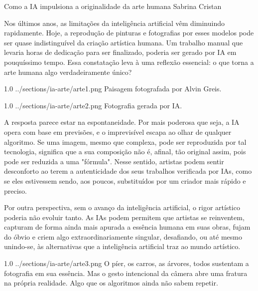 \hypearticle
{Como a IA impulsiona a originalidade da arte humana}
{Sabrina Cristan}
{

\hspace*{1.5em} Nos últimos anos, as limitações da 
inteligência 
artificial 
vêm diminuindo 
rapidamente. Hoje, a reprodução de pinturas 
e fotografias por esses modelos pode ser 
quase indistinguível da criação artística 
humana. Um trabalho manual que levaria 
horas de dedicação para ser finalizado, 
poderia ser gerado por IA em pouquíssimo 
tempo. Essa constatação leva à uma reflexão 
essencial: o que torna a arte humana algo 
verdadeiramente único? 

\articleimage
{1.0}
{../sections/ia-arte/arte1.png}
{Paisagem fotografada por Alvin Greis.}

\articleimage
{1.0}
{../sections/ia-arte/arte2.png}
{Fotografia gerada por IA.}

\subtitle{Espontaneidade como essência}

\hspace*{1.5em} A resposta parece estar na 
espontaneidade. Por mais poderosa que seja, 
a IA opera com base em previsões, e o 
imprevisível escapa ao olhar de qualquer 
algoritmo. Se uma imagem, mesmo que 
complexa, pode ser reproduzida por tal 
tecnologia, significa que a sua composição 
não é, afinal, tão original assim, pois pode ser 
reduzida a uma "fórmula".  
\hspace*{1.5em} Nesse sentido, artistas podem sentir 
desconforto ao terem a autenticidade dos 
seus trabalhos verificada por IAs, como se eles 
estivessem sendo, aos poucos, substituídos 
por um criador mais rápido e preciso. 

\subtitle{Parceria criativa}
\hspace*{1.5em} Por outra perspectiva, sem o avanço da 
inteligência artificial, o rigor artístico poderia 
não evoluir tanto. As IAs podem permitem que 
artistas se reinventem, capturam de forma 
ainda mais apurada a essência humana em 
suas obras, fujam do óbvio e criem algo 
extraordinariamente singular, desafiando, ou 
até mesmo unindo-se, às alternativas que a 
inteligência artificial traz ao mundo artístico. 

\articleimage
{1.0}
{../sections/ia-arte/arte3.png}
{O píer, os carros, as árvores, todos sustentam a fotografia em sua essência. Mas o gesto intencional da câmera abre uma fratura na própria realidade. Algo que os algoritmos ainda não sabem repetir.}

}
